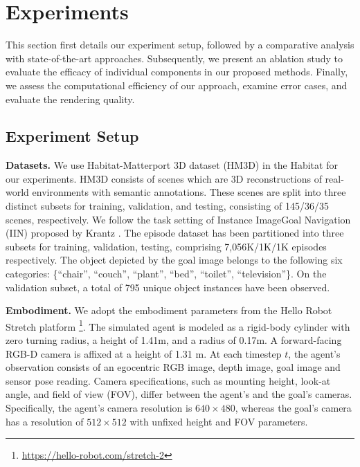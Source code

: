 
\section{Experiments}

This section first details our experiment setup, followed by a comparative analysis with state-of-the-art approaches. Subsequently, we present an ablation study to evaluate the efficacy of individual components in our proposed methods. Finally, we assess the computational efficiency of our approach, examine error cases, and evaluate the rendering quality.



\subsection{Experiment Setup}

\textbf{Datasets.} We use Habitat-Matterport 3D dataset (HM3D) \cite{yadav2023habitat} in the Habitat \cite{szot2022habitat} for our experiments. HM3D consists of scenes which are 3D reconstructions of real-world environments with semantic annotations. These scenes are split into three distinct subsets for training, validation, and testing, consisting of 145/36/35 scenes, respectively. We follow the task setting of Instance ImageGoal Navigation (IIN) proposed by Krantz \etal \cite{krantz2022instancespecific}. The episode dataset has been partitioned into three subsets for training, validation, testing, comprising 7,056K/1K/1K episodes respectively. The object depicted by the goal image belongs to the following six categories:  \{``chair'', ``couch'', ``plant'', ``bed'', ``toilet'', ``television''\}. On the validation subset, a total of 795 unique object instances have been observed.

\textbf{Embodiment.} We adopt the embodiment parameters from the Hello Robot Stretch platform \footnote{\url{https://hello-robot.com/stretch-2}}. The simulated agent is modeled as a rigid-body cylinder with zero turning radius, a height of 1.41m, and a radius of 0.17m. A forward-facing RGB-D camera is affixed at a height of 1.31 m. At each timestep $t$, the agent's observation consists of an egocentric RGB image, depth image, goal image and sensor pose reading. Camera specifications, such as mounting height, look-at angle, and field of view (FOV), differ between the agent's and the goal's cameras. Specifically, the agent's camera resolution is $640\times480$, whereas the goal's camera has a resolution of $512\times512$ with unfixed height and FOV parameters.

